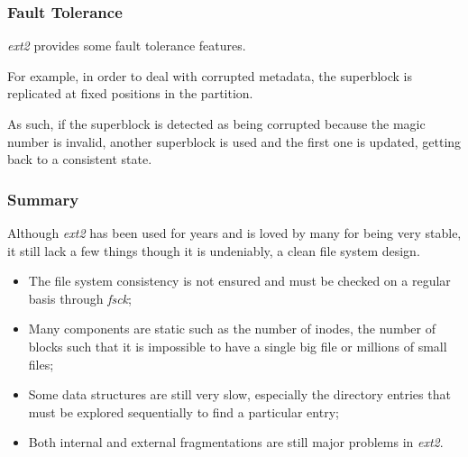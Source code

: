 
\begin{frame}
  \frametitle{Fault Tolerance}

  \textit{ext2} provides some fault tolerance features.

  \-

  For example, in order to deal with corrupted metadata, the superblock is
  replicated at fixed positions in the partition.

  \-

  As such, if the superblock is detected as being corrupted because the magic
  number is invalid, another superblock is used and the first one is updated,
  getting back to a consistent state.
\end{frame}


\begin{frame}
  \frametitle{Summary}

  Although \textit{ext2} has been used for years and is loved by many for
  being very stable, it still lack a few things though it is undeniably,
  a clean file system design.

  \begin{itemize}
    \item
      The file system consistency is not ensured and must be checked on
      a regular basis through \textit{fsck};
    \item
      Many components are static such as the number of inodes, the number of
      blocks \etc{} such that it is impossible to have a single big file
      or millions of small files;
    \item
      Some data structures are still very slow, especially the directory
      entries that must be explored sequentially to find a particular entry;
    \item
      Both internal and external fragmentations are still major problems
      in \textit{ext2}.
  \end{itemize}
\end{frame}


